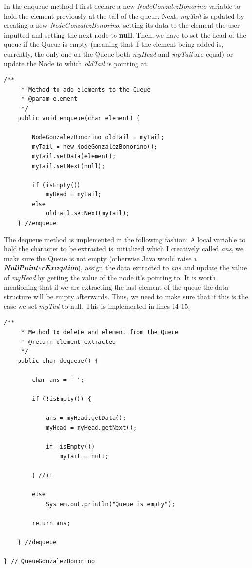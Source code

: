 \documentclass[letterpaper, 10pt]{article}
\begin{document}
In the enqueue method I first declare a new \textit{NodeGonzalezBonorino} variable to hold the element previously at the tail of the queue. Next, \textit{myTail} is updated by creating a new \textit{NodeGonzalezBonorino}, setting its data to the element the user inputted and setting the next node to \textbf{null}. Then, we have to set the head of the queue if the Queue is empty (meaning that if the element being added is, currently, the only one on the Queue both \textit{myHead} and \textit{myTail} are equal) or update the Node to which \textit{oldTail} is pointing at. 
\begin{lstlisting}
/**
	 * Method to add elements to the Queue
	 * @param element
	 */
	public void enqueue(char element) {
		
		NodeGonzalezBonorino oldTail = myTail;
		myTail = new NodeGonzalezBonorino();
		myTail.setData(element);
		myTail.setNext(null);
		
		if (isEmpty())
			myHead = myTail;
		else
			oldTail.setNext(myTail);
	} //enqueue
\end{lstlisting}

The dequeue method is implemented in the following fashion: A local variable to hold the character to be extracted is initialized which I creatively called \textit{ans}, we make sure the Queue is not empty (otherwise Java would raise a \textit{\textbf{NullPointerException}}), assign the data extracted to \textit{ans} and update the value of \textit{myHead} by getting the value of the node it's pointing to. It is worth mentioning that if we are extracting the last element of the queue the data structure will be empty afterwards. Thus, we need to make sure that if this is the case we set \textit{myTail} to null. This is implemented in lines 14-15. 
\begin{lstlisting}
/**
	 * Method to delete and element from the Queue
	 * @return element extracted
	 */
	public char dequeue() {
		
		char ans = ' ';
		
		if (!isEmpty()) {
			
			ans = myHead.getData();
			myHead = myHead.getNext();
			
			if (isEmpty())
				myTail = null;
			
		} //if
		
		else
			System.out.println("Queue is empty");
		
		return ans;
		
	} //dequeue
	
} // QueueGonzalezBonorino
\end{lstlisting}
\end{document}
